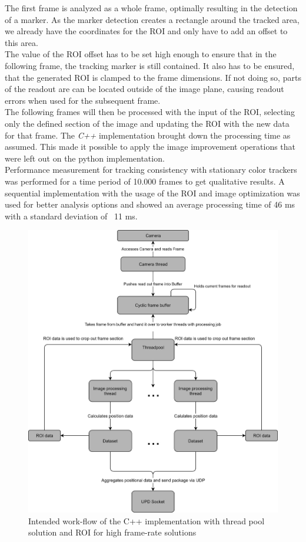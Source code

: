The first frame is analyzed as a whole frame, optimally resulting in the detection of a marker. As the marker detection creates a rectangle around the tracked area, we already have the coordinates for the ROI and only have to add an offset to this area.
\\The value of the ROI offset has to be set high enough to ensure that in the following frame, the tracking marker is still contained. It also has to be ensured, that the generated ROI is clamped to the frame dimensions. If not doing so, parts of the readout are can be located outside of the image plane, causing readout errors when used for the subsequent frame.
\\The following frames will then be processed with the input of the ROI, selecting only the defined section of the image and updating the ROI with the new data for that frame. The \textit{C++} implementation brought down the processing time as assumed. This made it possible to apply the image improvement operations that were left out on the python implementation.
\\Performance measurement for tracking consistency with stationary color trackers was performed for a time period of 10.000 frames to get qualitative results. 
A sequential implementation with the usage of the ROI and image optimization was used for better analysis options and showed an average processing time of 46 ms with a standard deviation of ~11 ms.\\
\begin{figure}[H]
\centering
\includegraphics[width=\textwidth]{images/pi_workflow_500.jpg}
\caption{Intended work-flow of the C++ implementation with thread pool solution and ROI for high frame-rate solutions}
\label{c++ work flow map} 
\end{figure}

